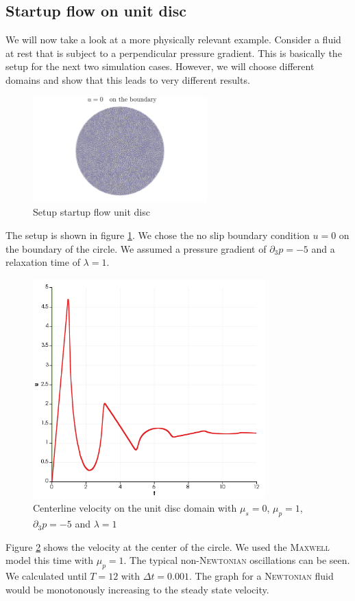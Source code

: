 \documentclass[12pt,a4paper,twoside, open=right]{scrreprt}
\theoremstyle{definition}
\theoremstyle{plain}
\begin{document}
\subsection{Startup flow on unit disc}
We will now take a look at a more physically relevant example. Consider a fluid at rest that is subject to a perpendicular pressure gradient. This is basically the setup for the next two simulation cases. However, we will choose different domains and show that this leads to very different results. 
\begin{figure}
    \centering
    \includegraphics[width=0.6\textwidth]{setupcircle}
    \caption{Setup startup flow unit disc}
    \label{fig:unitdiscsetup}
\end{figure}
The setup is shown in figure \ref{fig:unitdiscsetup}. We chose the no slip boundary condition $u=0$ on the boundary of the circle. We assumed a pressure gradient of $\partial_3 p=-5$ and a relaxation time of $\lambda=1$. 
\begin{figure}
    \centering
    \includegraphics[width=0.8\textwidth]{UnitDiscCenterline}
    \caption{Centerline velocity on the unit disc domain with $\mu_s=0$, $\mu_p=1$, $\partial_3 p=-5$ and $\lambda=1$}
    \label{fig:unitdisccenterline}
\end{figure}
Figure \ref{fig:unitdisccenterline} shows the velocity at the center of the circle. We used the \textsc{Maxwell} model this time with $\mu_p=1$. The typical non-\textsc{Newtonian} oscillations can be seen. We calculated until $T=12$ with $\Delta t=0.001$. The graph for a \textsc{Newtonian} fluid would be monotonously increasing to the steady state velocity.
\end{document}
